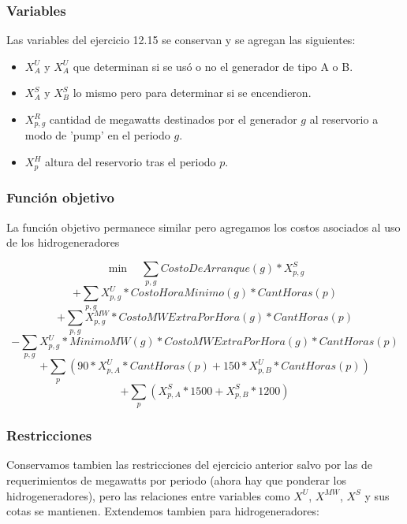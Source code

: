 \subsubsection{Variables}
Las variables del ejercicio 12.15 se conservan y se agregan las siguientes:
\begin{itemize}
    \item $X^U_A$ y $X^U_A$ que determinan si se usó o no el generador de tipo A o B.
    \item $X^S_A$ y $X^S_B$ lo mismo pero para determinar si se encendieron.
    \item $X^R_{p,g}$ cantidad de megawatts destinados por el generador $g$ al reservorio a modo de 'pump' en el periodo $g$.
    \item $X^H_p$ altura del reservorio tras el periodo $p$.
\end{itemize}

\subsubsection{Función objetivo}
La función objetivo permanece similar pero agregamos los costos asociados al uso de los hidrogeneradores

$$\min\quad \sum_{p,g} CostoDeArranque(g)*X^S_{p,g}$$
$$+ \sum_{p,g} X^{U}_{p,g} * CostoHoraMinimo(g) * CantHoras(p)$$
$$+ \sum_{p,g} X^{MW}_{p,g} * CostoMWExtraPorHora(g) * CantHoras(p)$$
$$- \sum_{p,g} X^{U}_{p,g} * MinimoMW(g) * CostoMWExtraPorHora(g) * CantHoras(p) $$
$$+ \sum_{p} (90*X^{U}_{p,A}*CantHoras(p) + 150*X^{U}_{p,B}*CantHoras(p))$$
$$+ \sum_{p} (X^S_{p,A}*1500 + X^S_{p,B}*1200) $$

\subsubsection{Restricciones}
Conservamos tambien las restricciones del ejercicio anterior salvo por las de requerimientos de megawatts por periodo (ahora hay que ponderar los hidrogeneradores), pero las relaciones entre variables como $X^U$, $X^{MW}$, $X^S$ y sus cotas se mantienen. Extendemos tambien para hidrogeneradores:

